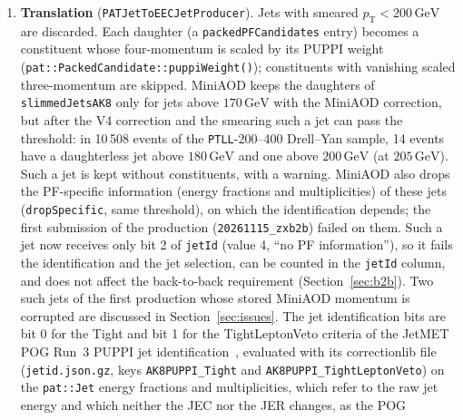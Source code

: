 \documentclass[11pt]{article}
\newcommand{\pt}{p_{\mathrm{T}}}
\newcommand{\GeV}{\ensuremath{\,\mathrm{GeV}}}
\newcommand{\code}[1]{\texttt{#1}}
\begin{document}
\begin{enumerate}
  \code{srcIdx}. The jet is scaled with \code{pat::Jet::scaleEnergy}, which inserts a correction level, so that the
  raw four-momentum and the energy fractions (hence the jet identification) are unchanged; the factor is stored as
  \code{jerFactor}. The constituents are not scaled. The central producer \code{SmearedPATJetProducer}
  (\code{PhysicsTools/PatUtils}) implements the same method but reads the resolution and scale factor from the global
  tag (which carries the older \code{Summer22EE\_*\_offline\_v1} AK8PFPuppi values) or from the JME text
  files~\cite{JMEjrdb}, not from the JSON file, and seeds its random numbers per event and jet order. The two
  producers agree (Section~\ref{sec:validation}).
\item \textbf{Translation} (\code{PATJetToEECJetProducer}). Jets with smeared $\pt < 200\GeV$ are discarded. Each
  daughter (a \code{packedPFCandidates} entry) becomes a constituent whose four-momentum is scaled by its PUPPI weight
  (\code{pat::PackedCandidate::puppiWeight()}); constituents with vanishing scaled three-momentum are skipped. MiniAOD
  keeps the daughters of \code{slimmedJetsAK8} only for jets above $170\GeV$ with the MiniAOD correction, but after
  the V4 correction and the smearing such a jet can pass the threshold: in 10\,508 events of the
  \code{PTLL}-200--400 Drell--Yan sample, 14 events have a daughterless jet above $180\GeV$ and one above $200\GeV$ (at $205\GeV$).
  Such a jet is kept without constituents, with a warning. MiniAOD also drops the PF-specific information (energy
  fractions and multiplicities) of these jets (\code{dropSpecific}, same threshold), on which the identification
  depends; the first submission of the production (\code{20261115\_zxb2b}) failed on them. Such a jet now receives only bit 2 of
  \code{jetId} (value 4, ``no PF information''), so it fails the identification and the jet selection, can be counted
  in the \code{jetId} column, and does not affect the back-to-back requirement (Section~\ref{sec:b2b}). Two such jets
  of the first production whose stored MiniAOD momentum is corrupted are discussed in Section~\ref{sec:issues}. The jet
  identification bits are bit 0 for the Tight and bit 1 for the TightLeptonVeto criteria of the JetMET POG Run~3 PUPPI
  jet identification~\cite{JMEjetid}, evaluated with its correctionlib file (\code{jetid.json.gz}, keys
  \code{AK8PUPPI\_Tight} and \code{AK8PUPPI\_TightLeptonVeto}) on the \code{pat::Jet} energy fractions and
  multiplicities, which refer to the raw jet energy and which neither the JEC nor the JER changes, as the POG

\end{enumerate}
\end{document}

